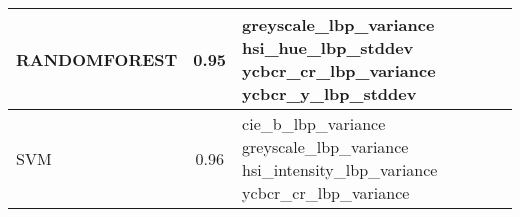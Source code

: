 \begin{longtable}{lcl}
\midrule
RANDOMFOREST & 0.95 & \begin{minipage}[t]{0.5\textwidth} greyscale\_lbp\_variance hsi\_hue\_lbp\_stddev ycbcr\_cr\_lbp\_variance ycbcr\_y\_lbp\_stddev  \end{minipage} \\
\midrule
SVM & 0.96 & \begin{minipage}[t]{0.5\textwidth} cie\_b\_lbp\_variance greyscale\_lbp\_variance hsi\_intensity\_lbp\_variance ycbcr\_cr\_lbp\_variance  \end{minipage}\\
\end{longtable}

